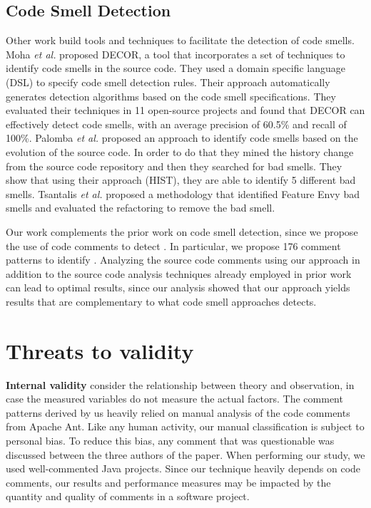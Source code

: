 \subsection{Code Smell Detection}

Other work build tools and techniques to facilitate the detection of code smells. Moha \textit{et al.} \cite{Moha2010TSE} proposed DECOR, a tool that incorporates a set of techniques to identify code smells in the source code. They used a domain specific language (DSL) to specify code smell detection rules. Their approach automatically generates detection algorithms based on the code smell specifications. They evaluated their techniques in 11 open-source projects and found that DECOR can effectively detect code smells, with an average precision of 60.5\% and recall of 100\%. Palomba \textit{et al.} \cite{Palomba2013} proposed an approach to identify code smells based on the evolution of the source code. In order to do that they mined the history change from the source code repository and then they searched for bad smells. They show that using their approach (HIST), they are able to identify 5 different bad smells. Tsantalis \textit{et al.} \cite{Tsantalis2009TSE} proposed a methodology that identified Feature Envy bad smells and evaluated the refactoring to remove the bad smell.

Our work complements the prior work on code smell detection, since we propose the use of code comments to detect \SATD. In particular, we propose 176 comment patterns to identify \SATD. Analyzing the source code comments using our approach in addition to the source code analysis techniques already employed in prior work can lead to optimal results, since our analysis showed that our approach yields results that are complementary to what code smell approaches detects.

\section{Threats to validity}
\label{sec:threats_to_validity}


\noindent\textbf{Internal validity} consider the relationship between theory and observation, in case the measured variables do not measure the actual factors. The comment patterns derived by us heavily relied on manual analysis of the code comments from Apache Ant. Like any human activity, our manual classification is subject to personal bias. To reduce this bias, any comment that was questionable was discussed between the three authors of the paper. When performing our study, we used well-commented Java projects. Since our technique heavily depends on code comments, our results and performance measures may be impacted by the quantity and quality of comments in a software project.  

